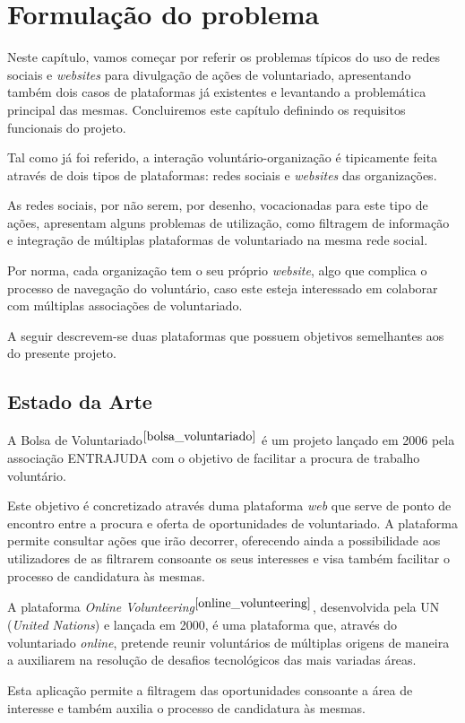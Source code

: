 \section{Formulação do problema}
Neste capítulo, vamos começar por referir os problemas típicos do uso de redes sociais e \textit{websites} para divulgação de ações de voluntariado, apresentando também dois casos de plataformas já existentes e levantando a problemática principal das mesmas. Concluiremos este capítulo definindo os requisitos funcionais do projeto. \par \bigskip

Tal como já foi referido, a interação voluntário-organização é tipicamente feita através de dois tipos de plataformas: redes sociais e \textit{websites} das organizações. \par \bigskip

As redes sociais, por não serem, por desenho, vocacionadas para este tipo de ações, apresentam alguns problemas de utilização, como filtragem de informação e integração de múltiplas plataformas de voluntariado na mesma rede social. \par \bigskip

Por norma, cada organização tem o seu próprio \textit{website}, algo que complica o processo de navegação do voluntário, caso este esteja interessado em colaborar com múltiplas associações de voluntariado. \par \bigskip
A seguir descrevem-se duas plataformas que possuem objetivos semelhantes aos do presente projeto. \par \bigskip

\subsection{Estado da Arte}

A Bolsa de Voluntariado$^{\cite{bolsa_voluntariado}}$ é um projeto lançado em 2006 pela associação ENTRAJUDA com o objetivo de facilitar a procura de trabalho voluntário.  \par \medskip
Este objetivo é concretizado através duma plataforma \textit{web} que serve de ponto de encontro entre a procura e oferta de oportunidades de voluntariado. A plataforma permite consultar ações que irão decorrer, oferecendo ainda a possibilidade aos utilizadores de as filtrarem consoante os seus interesses e visa também facilitar o processo de candidatura às mesmas. \par \bigskip

A plataforma \textit{Online Volunteering}$^{\cite{online_volunteering}}$, desenvolvida pela UN (\textit{United Nations}) e lançada em 2000, é uma plataforma que, através do voluntariado \textit{online}, pretende reunir voluntários de múltiplas origens de maneira a auxiliarem na resolução de desafios tecnológicos das mais variadas áreas.  \par \medskip
Esta aplicação permite a filtragem das oportunidades consoante a área de interesse e também auxilia o processo de candidatura às mesmas. \bigskip

